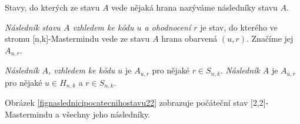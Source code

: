 Stavy, do kterých ze stavu $A$ vede nějaká hrana nazýváme následníky stavu $A$. 

\begin{definice}\label{potomek}
  
  \emph{Následník stavu $A$ vzhledem ke kódu $u$ a ohodnocení $r$} je stav, do kterého ve stromu [n,k]-Mastermindu vede ze stavu $A$ hrana obarvená $(u,r)$. Značíme jej $A_{u,r}$. 
  
\end{definice}
\begin{pozn}
    \emph{Následník $A$, vzhledem ke kódu $u$} je $A_{u,r}$ pro nějaké $r \in S_{n,k}$. \emph{Následník $A$} je $A_{u,r}$ pro nějaké $u\in H_{n,k}$ a $r \in S_{n,k}$. 
\end{pozn}
Obrázek \ref{fignaslednicipocatecnihostavu22} zobrazuje počáteční stav [2,2]-Mastermindu a všechny jeho následníky. 

